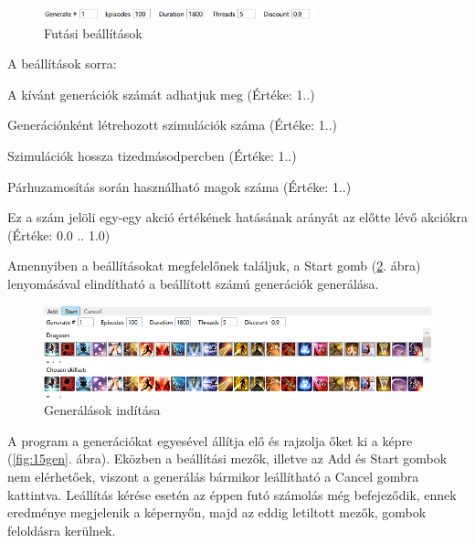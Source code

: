 \documentclass[12pt]{article}
\begin{document}
	\begin{figure}[H]
		\begin{center}
			\includegraphics[width=0.7\textwidth]{options}
		\end{center}
		\caption{Futási beállítások}
		\label{fig:options}
	\end{figure}
	
	A beállítások sorra:
	
	\begin{description}[align=right,labelwidth=3cm]
		 \item [Generate] A kívánt generációk számát adhatjuk meg (Értéke: 1..)
		 \item [Episodes] Generációnként létrehozott szimulációk száma (Értéke: 1..)
		 \item [Duration] Szimulációk hossza tizedmásodpercben (Értéke: 1..)
		 \item [Threads] Párhuzamosítás során használható magok száma (Értéke: 1..)
		 \item [Discount] Ez a szám jelöli egy-egy akció értékének hatásának arányát az előtte lévő akciókra (Értéke: 0.0 .. 1.0)
	\end{description}
	
	Amennyiben a beállításokat megfelelőnek találjuk, a Start gomb (\ref{fig:startgen}. ábra) lenyomásával elindítható a beállított számú generációk generálása. 
	
	\begin{figure}[H]
		\begin{center}
			\includegraphics[width=1\textwidth]{startgen}
		\end{center}
		\caption{Generálások indítása}
		\label{fig:startgen}
	\end{figure}
	
	A program a generációkat egyesével állítja elő és rajzolja őket ki a képre (\ref{fig:15gen}. ábra). Eközben a beállítási mezők, illetve az Add és Start gombok nem elérhetőek, viszont a generálás bármikor leállítható a Cancel gombra kattintva.
	Leállítás kérése esetén az éppen futó számolás még befejeződik, ennek eredménye megjelenik a képernyőn, majd az eddig letiltott mezők, gombok feloldásra kerülnek.
	
\end{document}
